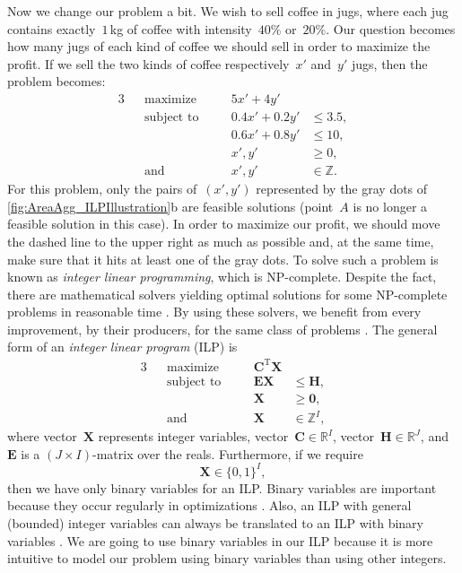 Now we change our problem a bit.
We wish to sell coffee in jugs,
where each jug contains exactly~$1\,$kg of coffee 
with intensity~$40\%$ or~$20\%$.
Our question becomes how many jugs of each kind of coffee
we should sell in order to maximize the profit.
If we sell the two kinds of coffee 
respectively~$x'$ and~$y'$ jugs,
then the problem becomes:
\begin{alignat*}{3}
&&\text{maximize} 	\quad	&& 5x'+4y' 		&			\\
&&\text{subject to} \quad	&& 0.4x'+0.2y'	&\le 3.5, 	\\
&&					\quad	&& 0.6x'+0.8y' 	&\le 10, 	\\
&&					\quad	&& x', y' 		&\ge 0, 	\\
&&\text{and} 		\quad	&& x', y'		&\in \mathbb{Z}.
\end{alignat*}
For this problem, only the pairs of~$(x',y')$ 
represented by the gray dots of 
\fig\ref{fig:AreaAgg_ILPIllustration}b 
are feasible solutions
(point~$A$ is no longer a feasible solution in this case).
In order to maximize our profit,
we should move the dashed line to the upper right 
as much as possible
and, at the same time, make sure that 
it hits at least one of the gray dots.
To solve such a problem is known as
\emph{integer linear programming},
which is NP-complete.
Despite the fact, there are
mathematical solvers yielding optimal solutions
for some NP-complete problems in reasonable time
\parencite{Haunert2017Label}.
By using these solvers, 
we benefit from every improvement, by their producers,
for the same class of problems
\parencite{Haunert2017Label}.
The general form of an \emph{integer linear program} (ILP) is
\begin{alignat*}{3}
&&\text{maximize} 	\quad&& \bm{C}^\mathrm{T}\bm{X}	&		\\
&&\text{subject to} \quad&& \bm{EX}			&\le \bm{H}, 	\\
&&					\quad&& \bm{X} 			&\ge \bm{0}, 	\\
&&\text{and}		\quad&& \bm{X} 			&\in \mathbb{Z}^I,
\end{alignat*}
where vector~$\bm{X}$ represents integer variables, 
vector~$\bm{C} \in \mathbb{R}^I$, 
vector~$\bm{H} \in \mathbb{R}^J$,
and~$\bm{E}$ is a $(J \times I)$-matrix over the reals.
Furthermore, if we require 
$$
\bm{X} 	\in \{0,1\}^I,
$$
then we have only binary variables for an ILP.
Binary variables are important 
because they occur regularly in optimizations
\parencite[]{bradley1977applied}.
Also, an ILP with general (bounded) integer variables 
can always be translated to an ILP with binary variables
\parencite[]{Williams2009Integer}.
We are going to use binary variables in our ILP
because it is more intuitive 
to model our problem using binary variables
than using other integers.

